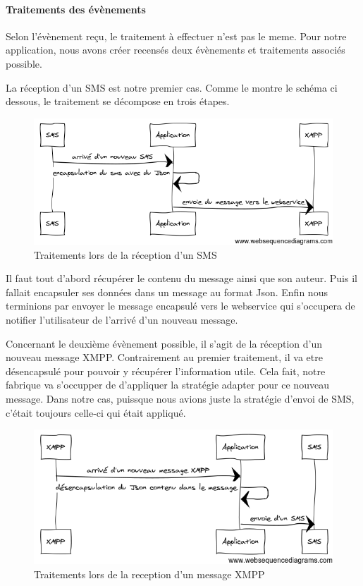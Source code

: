 \paragraph{Traitements des évènements}

Selon l'évènement reçu, le traitement à effectuer n'est pas le meme. Pour notre application, nous avons 
créer recensés deux évènements et traitements associés possible.

La réception d'un SMS est notre premier cas. Comme le montre le schéma ci dessous, le traitement se 
décompose en trois étapes. 

\begin{figure}[!h]
	\center
	\includegraphics[width=12cm]{img/encapsulation-sms.png}
	\caption{Traitements lors de la réception d'un SMS}
\end{figure}

Il faut tout d'abord récupérer le contenu du message ainsi que son auteur. Puis il fallait encapsuler 
ses données dans un message au format Json. Enfin nous terminions par envoyer le message encapsulé vers 
le webservice qui s'occupera de notifier l'utilisateur de l'arrivé d'un nouveau message.

Concernant le deuxième évènement possible, il s'agit de la réception d'un nouveau message XMPP. Contrairement
au premier traitement, il va etre désencapsulé pour pouvoir y récupérer l'information utile. Cela fait, 
notre fabrique va s'occupper de d'appliquer la stratégie adapter pour ce nouveau message. Dans notre cas, 
puissque nous avions juste la stratégie d'envoi de SMS, c'était toujours celle-ci qui était appliqué.


\begin{figure}[!h]
	\center
	\includegraphics[width=12cm]{img/desencapsulation.png}
	\caption{Traitements lors de la reception d'un message XMPP}
\end{figure}


